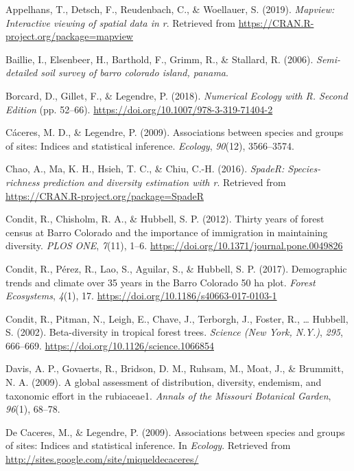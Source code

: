 \documentclass[11pt,]{article}
\begin{document}
\hypertarget{refs}{}
\hypertarget{ref-cita_mapview}{}
Appelhans, T., Detsch, F., Reudenbach, C., \& Woellauer, S. (2019).
\emph{Mapview: Interactive viewing of spatial data in r}. Retrieved from
\url{https://CRAN.R-project.org/package=mapview}

\hypertarget{ref-baillie_soil}{}
Baillie, I., Elsenbeer, H., Barthold, F., Grimm, R., \& Stallard, R.
(2006). \emph{Semi-detailed soil survey of barro colorado island,
panama}.

\hypertarget{ref-borcard_legendre}{}
Borcard, D., Gillet, F., \& Legendre, P. (2018). \emph{Numerical Ecology
with R. Second Edition} (pp. 52--66).
\url{https://doi.org/10.1007/978-3-319-71404-2}

\hypertarget{ref-caceres2009associations}{}
Cáceres, M. D., \& Legendre, P. (2009). Associations between species and
groups of sites: Indices and statistical inference. \emph{Ecology},
\emph{90}(12), 3566--3574.

\hypertarget{ref-spader_chao}{}
Chao, A., Ma, K. H., Hsieh, T. C., \& Chiu, C.-H. (2016). \emph{SpadeR:
Species-richness prediction and diversity estimation with r}. Retrieved
from \url{https://CRAN.R-project.org/package=SpadeR}

\hypertarget{ref-condit_et_al_2012}{}
Condit, R., Chisholm, R. A., \& Hubbell, S. P. (2012). Thirty years of
forest census at Barro Colorado and the importance of immigration in
maintaining diversity. \emph{PLOS ONE}, \emph{7}(11), 1--6.
\url{https://doi.org/10.1371/journal.pone.0049826}

\hypertarget{ref-condit_et_al_2017}{}
Condit, R., Pérez, R., Lao, S., Aguilar, S., \& Hubbell, S. P. (2017).
Demographic trends and climate over 35 years in the Barro Colorado 50 ha
plot. \emph{Forest Ecosystems}, \emph{4}(1), 17.
\url{https://doi.org/10.1186/s40663-017-0103-1}

\hypertarget{ref-article_condit}{}
Condit, R., Pitman, N., Leigh, E., Chave, J., Terborgh, J., Foster, R.,
\ldots{} Hubbell, S. (2002). Beta-diversity in tropical forest trees.
\emph{Science (New York, N.Y.)}, \emph{295}, 666--669.
\url{https://doi.org/10.1126/science.1066854}

\hypertarget{ref-davis2009global}{}
Davis, A. P., Govaerts, R., Bridson, D. M., Ruhsam, M., Moat, J., \&
Brummitt, N. A. (2009). A global assessment of distribution, diversity,
endemism, and taxonomic effort in the rubiaceae1. \emph{Annals of the
Missouri Botanical Garden}, \emph{96}(1), 68--78.

\hypertarget{ref-cita_indicspecies}{}
De Caceres, M., \& Legendre, P. (2009). Associations between species and
groups of sites: Indices and statistical inference. In \emph{Ecology}.
Retrieved from \url{http://sites.google.com/site/miqueldecaceres/}
\end{document}
